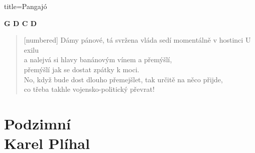 \documentclass[openany]{memoir}
\begin{document}
\begin{minipage}{0.7\linewidth}
\begin{song}{title=Pangajó}
\begin{verse*}
\textbf{G  D  C  D}
\end{verse*}
\begin{verse}[numbered]
Dámy pánové, tá svržena vláda sedí momentálně v hostinci U exilu \\
a nalejvá si hlavy banánovým vínem a přemýšlí, \\
přemýšlí jak se dostat zpátky k moci.\\
No, když bude dost dlouho přemejšlet, tak určitě na něco přijde,\\
co třeba takhle vojensko-politický převrat!\\
\end{verse}
\end{song}
\end{minipage}

\chapter{Podzimní\\ \huge{Karel Plíhal}}
\end{document}
